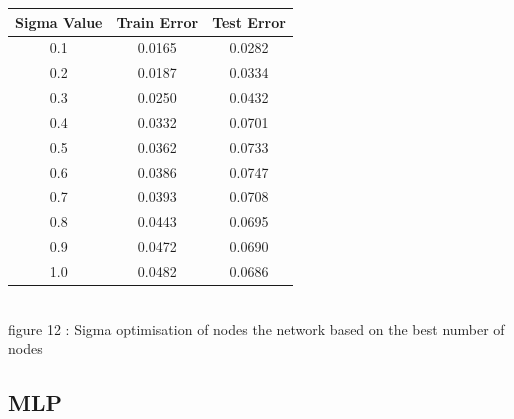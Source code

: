 \documentclass{IEEEtran}[11pt]
\begin{document}
\begin{center}
  \begin{tabular}{||c c c||}
    \hline
    Sigma Value & Train Error & Test Error \\ [0.5ex]
    \hline
    0.1 & 0.0165 & 0.0282 \\
    0.2 & 0.0187 & 0.0334 \\
    0.3 & 0.0250 & 0.0432 \\
    0.4 & 0.0332 & 0.0701 \\
    0.5 & 0.0362 & 0.0733 \\
    0.6 & 0.0386 & 0.0747 \\
    0.7 & 0.0393 & 0.0708 \\
    0.8 & 0.0443 & 0.0695 \\
    0.9 & 0.0472 & 0.0690 \\
    1.0 & 0.0482 & 0.0686 \\
    \hline
  \end{tabular}
  \\
  \vspace{2.5mm}
  {\footnotesize figure 12 : Sigma optimisation of nodes the network based on the
  best number of nodes}
\end{center}
\subsection{MLP}
\end{document}
